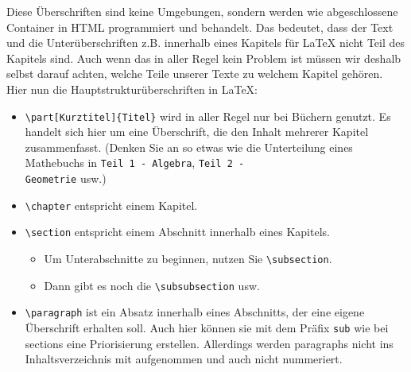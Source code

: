 Diese Überschriften sind keine Umgebungen, sondern werden wie abgeschlossene Container in HTML programmiert und behandelt. Das bedeutet, dass der Text und die Unterüberschriften z.B. innerhalb eines Kapitels für LaTeX nicht Teil des Kapitels sind. Auch wenn das in aller Regel kein Problem ist müssen wir deshalb selbst darauf achten, welche Teile unserer Texte zu welchem Kapitel gehören.\\

Hier nun die Hauptstrukturüberschriften in LaTeX:

\begin{itemize}
	\item \verb|\part[Kurztitel]{Titel}| wird in aller Regel nur bei Büchern genutzt. Es handelt sich hier um eine Überschrift, die den Inhalt mehrerer Kapitel zusammenfasst. (Denken Sie an so etwas wie die Unterteilung eines Mathebuchs in \verb|Teil 1 - Algebra|, \verb|Teil 2 -|\\\verb|Geometrie| usw.)
	\item \verb|\chapter| entspricht einem Kapitel.
	\item \verb|\section| entspricht einem Abschnitt innerhalb eines Kapitels.
	\begin{itemize}
		\item Um Unterabschnitte zu beginnen, nutzen Sie \verb|\subsection|.
		\item Dann gibt es noch die \verb|\subsubsection| usw.
	\end{itemize}
	\item \verb|\paragraph| ist ein Absatz innerhalb eines Abschnitts, der eine eigene Überschrift erhalten soll. Auch hier können sie mit dem Präfix \verb|sub| wie bei sections eine Priorisierung erstellen. Allerdings werden paragraphs nicht ins Inhaltsverzeichnis mit aufgenommen und auch nicht nummeriert.
\end{itemize}


